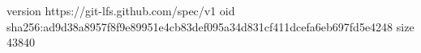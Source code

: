 version https://git-lfs.github.com/spec/v1
oid sha256:ad9d38a8957f8f9e89951e4cb83def095a34d831cf411dcefa6eb697fd5e4248
size 43840
